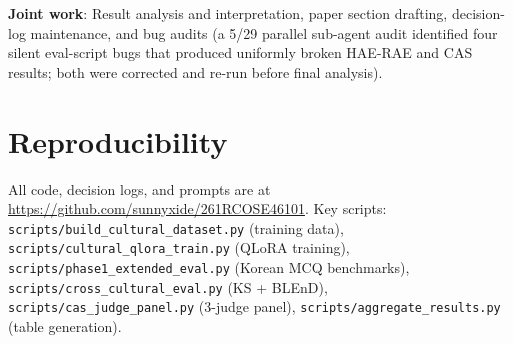\documentclass{article}
\begin{document}
\textbf{Joint work}: Result analysis and interpretation, paper section drafting, decision-log maintenance, and bug audits (a 5/29 parallel sub-agent audit identified four silent eval-script bugs that produced uniformly broken HAE-RAE and CAS results; both were corrected and re-run before final analysis).

\section{Reproducibility}

All code, decision logs, and prompts are at \url{https://github.com/sunnyxide/261RCOSE46101}. Key scripts:
\verb|scripts/build_cultural_dataset.py| (training data),
\verb|scripts/cultural_qlora_train.py| (QLoRA training),
\verb|scripts/phase1_extended_eval.py| (Korean MCQ benchmarks),
\verb|scripts/cross_cultural_eval.py| (KS + BLEnD),
\verb|scripts/cas_judge_panel.py| (3-judge panel),
\verb|scripts/aggregate_results.py| (table generation).
\end{document}
